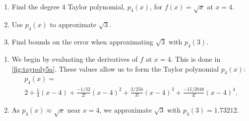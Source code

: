 \begin{example}\label{ex_taypoly5}%
\mbox{}\\[-2\baselineskip]\parbox[t]{\linewidth}{\begin{enumerate}
	\item	Find the degree 4 Taylor polynomial, $p_4(x)$, for $f(x)=\sqrt{x}$ at $x=4.$
	\item	Use $p_4(x)$ to approximate $\sqrt{3}$.
	\item	Find bounds on the error when approximating $\sqrt{3}$ with $p_4(3)$.
\end{enumerate}}\vspace{0pt}
\solution
\begin{enumerate}
	\item	We begin by evaluating the derivatives of $f$ at $x=4$. This is done in \autoref{fig:taypoly5a}. These values allow us to form the Taylor polynomial $p_4(x)$:
%
\begin{multline*}
p_4(x) = \\
2 + \frac14(x-4) +\frac{-1/32}{2!}(x-4)^2+\frac{3/256}{3!}(x-4)^3+\frac{-15/2048}{4!}(x-4)^4.
\end{multline*}

	\item	As $p_4(x) \approx \sqrt{x}$ near $x=4$, we approximate $\sqrt{3}$ with $p_4(3) = 1.73212$.


\end{enumerate}
\end{example}
